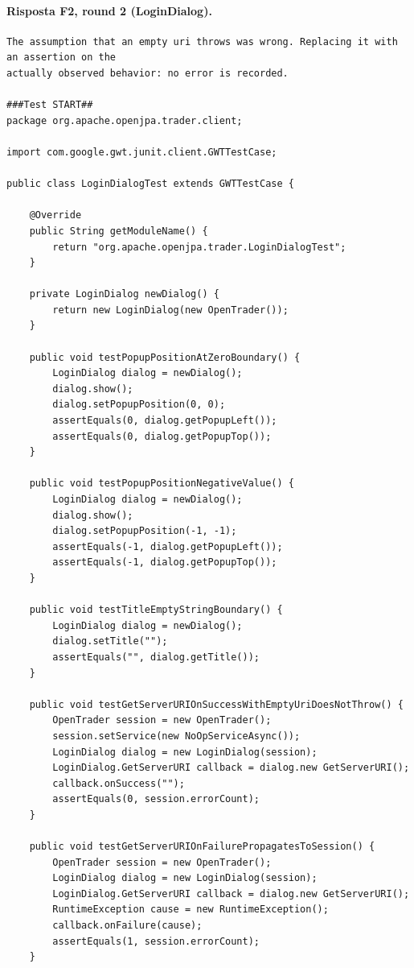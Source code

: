 \paragraph*{Risposta F2, round 2 (LoginDialog).}
\label{risposta:ld-f2-r2}
\begin{lstlisting}
The assumption that an empty uri throws was wrong. Replacing it with an assertion on the
actually observed behavior: no error is recorded.

###Test START##
package org.apache.openjpa.trader.client;

import com.google.gwt.junit.client.GWTTestCase;

public class LoginDialogTest extends GWTTestCase {

    @Override
    public String getModuleName() {
        return "org.apache.openjpa.trader.LoginDialogTest";
    }

    private LoginDialog newDialog() {
        return new LoginDialog(new OpenTrader());
    }

    public void testPopupPositionAtZeroBoundary() {
        LoginDialog dialog = newDialog();
        dialog.show();
        dialog.setPopupPosition(0, 0);
        assertEquals(0, dialog.getPopupLeft());
        assertEquals(0, dialog.getPopupTop());
    }

    public void testPopupPositionNegativeValue() {
        LoginDialog dialog = newDialog();
        dialog.show();
        dialog.setPopupPosition(-1, -1);
        assertEquals(-1, dialog.getPopupLeft());
        assertEquals(-1, dialog.getPopupTop());
    }

    public void testTitleEmptyStringBoundary() {
        LoginDialog dialog = newDialog();
        dialog.setTitle("");
        assertEquals("", dialog.getTitle());
    }

    public void testGetServerURIOnSuccessWithEmptyUriDoesNotThrow() {
        OpenTrader session = new OpenTrader();
        session.setService(new NoOpServiceAsync());
        LoginDialog dialog = new LoginDialog(session);
        LoginDialog.GetServerURI callback = dialog.new GetServerURI();
        callback.onSuccess("");
        assertEquals(0, session.errorCount);
    }

    public void testGetServerURIOnFailurePropagatesToSession() {
        OpenTrader session = new OpenTrader();
        LoginDialog dialog = new LoginDialog(session);
        LoginDialog.GetServerURI callback = dialog.new GetServerURI();
        RuntimeException cause = new RuntimeException();
        callback.onFailure(cause);
        assertEquals(1, session.errorCount);
    }


\end{lstlisting}
